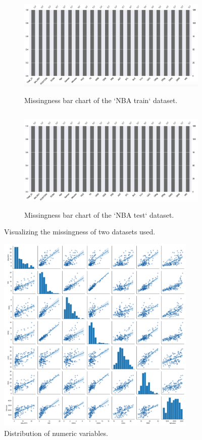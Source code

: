 \documentclass[letterpaper,12pt,twoside,]{pinp}
\begin{document}
\begin{figure}
\begin{subfigure}{0.55\textwidth}
\includegraphics[width=0.9\linewidth, height=5cm]{nbaTrain_miss.png} 
\caption{Missingness bar chart of the `NBA train` dataset.}
\label{fig:trainMiss}
\end{subfigure}
\begin{subfigure}{0.55\textwidth}
\includegraphics[width=0.9\linewidth, height=5cm]{nbaTest_miss.png}
\caption{Missingness bar chart of the `NBA test` dataset.}
\label{fig:testMiss}
\end{subfigure}
\caption{Visualizing the missingness of two datasets used.}
\label{fig:missingness}
\end{figure}

\begin{figure}
\includegraphics[width=0.85\textwidth]{scatter.png}
\centering
\caption{Distribution of numeric variables.}
\label{fig:scatter}
\end{figure}
\end{document}
